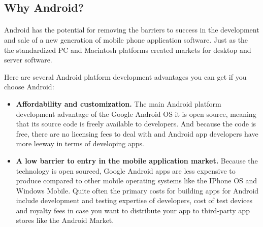 \subsection{Why Android?}
\paragraph{}
Android has the potential for removing the barriers to success in the development and sale of a new generation of mobile phone application software. Just as the the standardized PC and Macintosh platforms created markets for desktop and server software.

Here are several Android platform development advantages you can get if you choose Android:

\begin{itemize}
\item \textbf{Affordability and customization.} The main Android platform development advantage of the Google Android OS it is open source, meaning that its source code is freely available to developers. And because the code is free, there are no licensing fees to deal with and Android app developers have more leeway in terms of developing apps.

\item \textbf{A low barrier to entry in the mobile application market.} Because the technology is open sourced, Google Android apps are less expensive to produce compared to other mobile operating systems like the IPhone OS and Windows Mobile. Quite often the primary costs for building apps for Android include development and testing expertise of developers, cost of test devices and royalty fees in case you want to distribute your app to third-party app stores like the Android Market.

\end{itemize}


    

    

    

    

